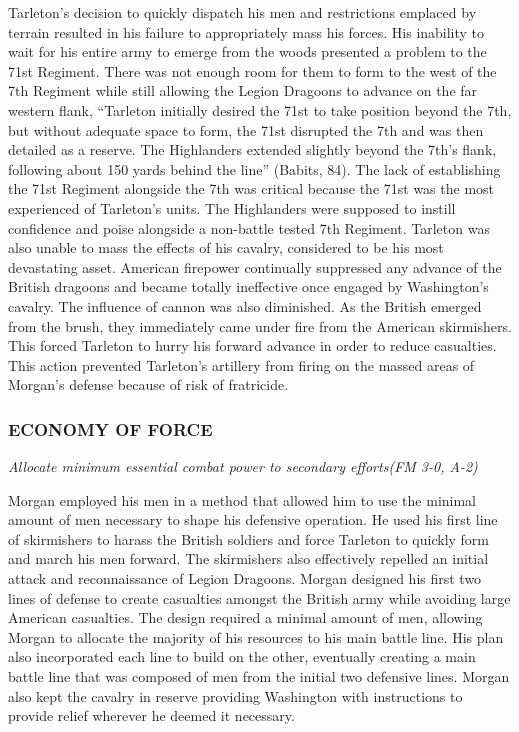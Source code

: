 Tarleton’s decision to quickly dispatch his men and restrictions emplaced by
terrain resulted in his failure to appropriately mass his forces.   His
inability to wait for his entire army to emerge from the woods presented a
problem to the 71st Regiment.  There was not enough room for them to form to
the west of the 7th Regiment while still allowing the Legion Dragoons to
advance on the far western flank, “Tarleton initially desired the 71st to take
position beyond the 7th, but without adequate space to form, the 71st disrupted
the 7th and was then detailed as a reserve.  The Highlanders extended slightly
beyond the 7th’s flank, following about 150 yards behind the line” (Babits,
84).  The lack of establishing the 71st Regiment alongside the 7th was critical
because the 71st was the most experienced of Tarleton’s units.  The Highlanders
were supposed to instill confidence and poise alongside a non-battle tested 7th
Regiment.  Tarleton was also unable to mass the effects of his cavalry,
considered to be his most devastating asset.  American firepower continually
suppressed any advance of the British dragoons and became totally ineffective
once engaged by Washington’s cavalry.  The influence of cannon was also
diminished.  As the British emerged from the brush, they immediately came under
fire from the American skirmishers.  This forced Tarleton to hurry his forward
advance in order to reduce casualties.  This action prevented Tarleton’s
artillery from firing on the massed areas of Morgan’s defense because of risk
of fratricide.   

\subsubsection{ECONOMY OF FORCE}

\textit{Allocate minimum essential combat power to secondary efforts(FM 3-0, A-2)}

Morgan employed his men in a method that allowed him to use the minimal amount
of men necessary to shape his defensive operation.  He used his first line of
skirmishers to harass the British soldiers and force Tarleton to quickly form
and march his men forward.  The skirmishers also effectively repelled an
initial attack and reconnaissance of Legion Dragoons.  Morgan designed his
first two lines of defense to create casualties amongst the British army while
avoiding large American casualties.  The design required a minimal amount of
men, allowing Morgan to allocate the majority of his resources to his main
battle line.  His plan also incorporated each line to build on the other,
eventually creating a main battle line that was composed of men from the
initial two defensive lines.  Morgan also kept the cavalry in reserve providing
Washington with instructions to provide relief wherever he deemed it necessary.  

